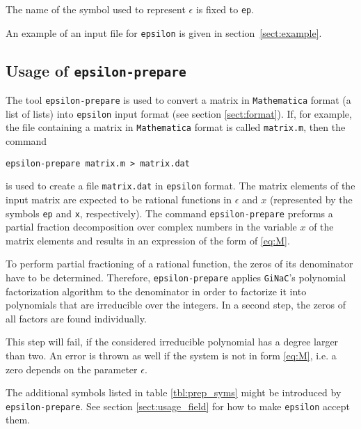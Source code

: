 \documentclass[12pt]{article}
\numberwithin{equation}{section}
\numberwithin{figure}{section}
\begin{document}
      The name of the symbol used to represent $\epsilon$ is fixed to \texttt{ep}.

      An example of an input file for \texttt{epsilon} is given in section~\ref{sect:example}.
    \subsection{Usage of \texttt{epsilon-prepare}}
      The tool \texttt{epsilon-prepare} is used to convert a matrix in \texttt{Mathematica} format (a list of lists) into \texttt{epsilon} input format (see section \ref{sect:format}).
      If, for example, the file containing a matrix in \texttt{Mathematica} format is called \texttt{matrix.m}, then the command
      \begin{lstlisting}[basicstyle=\ttfamily,xleftmargin=-4em]
        epsilon-prepare matrix.m > matrix.dat
      \end{lstlisting}
      is used to create a file \texttt{matrix.dat} in \texttt{epsilon} format.
      The matrix elements of the input matrix are expected to be rational functions in $\epsilon$ and $x$ (represented by the symbols \texttt{ep} and \texttt{x}, respectively).
      The command \texttt{epsilon-prepare} preforms a partial fraction decomposition over complex numbers in the variable $x$ of the matrix elements and results in an expression of the form of \eqref{eq:M}.
      
      To perform partial fractioning of a rational function, the zeros of its denominator have to be determined.
      Therefore, \texttt{epsilon-prepare} applies \texttt{GiNaC}'s polynomial factorization algorithm to the denominator in order to factorize it into polynomials that are irreducible over the integers.
      In a second step, the zeros of all factors are found individually.

      This step will fail, if the considered irreducible polynomial has a degree larger than two.
      An error is thrown as well if the system is not in form \eqref{eq:M}, i.e. a zero depends on the parameter $\epsilon$.

      The additional symbols listed in table \ref{tbl:prep_syms} might be introduced by \texttt{epsilon-prepare}.
      See section \ref{sect:usage_field} for how to make \texttt{epsilon} accept them.
\end{document}
